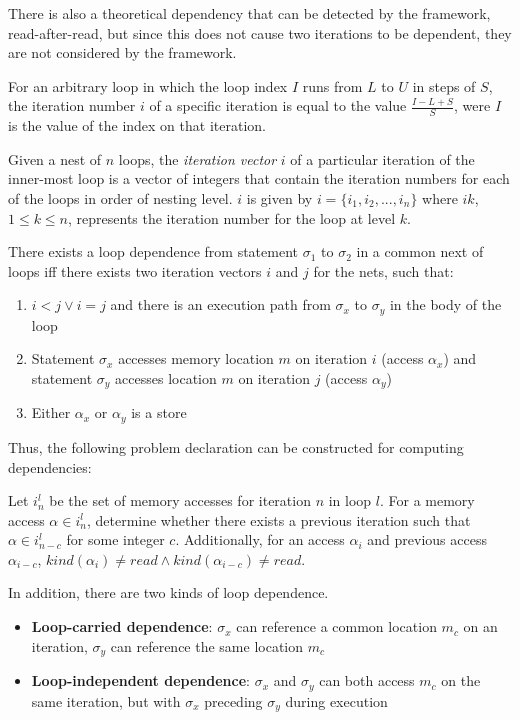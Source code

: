 	There is also a theoretical dependency that can be detected by the framework, read-after-read, but since this does not cause two iterations to be dependent, they are not considered by the framework.
	
	For an arbitrary loop in which the loop index $I$ runs from $L$ to $U$ in steps of $S$, the iteration number $i$ of a specific iteration is equal to the value $\frac{I-L+S}{S}$, were $I$ is the value of the index on that iteration.
	
	Given a nest of $n$ loops, the \textit{iteration vector} $i$ of a particular iteration of the inner-most loop is a vector of integers that contain the iteration numbers for each of the loops in order of nesting level. $i$ is given by $i=\{i_1, i_2, ..., i_n\}$ where $ik$, $1 \leq k \leq n$, represents the iteration number for the loop at level $k$.
	
	There exists a loop dependence from statement $\sigma_1$ to $\sigma_2$ in a common next of loops iff there exists two iteration vectors $i$ and $j$ for the nets, such that:
	
	\begin{enumerate}
		\item $i < j \lor i = j$ and there is an execution path from $\sigma_x$ to $\sigma_y$ in the body of the loop
		\item Statement $\sigma_x$ accesses memory location $m$ on iteration $i$ (access $\alpha_x$) and statement $\sigma_y$ accesses location $m$ on iteration $j$ (access $\alpha_y$)
		\item Either $\alpha_x$ or $\alpha_y$ is a store
	\end{enumerate}
	
	Thus, the following problem declaration can be constructed for computing dependencies:
	
	Let $i^l_n$ be the set of memory accesses for iteration $n$ in loop $l$. For a memory access $\alpha \in i^l_n$, determine whether there exists a previous iteration such that $\alpha \in i^l_{n-c}$ for some integer $c$. Additionally, for an access $\alpha_i$ and previous access $\alpha_{i-c}$, $kind(\alpha_i) \neq read \land kind(\alpha_{i-c}) \neq read$.
	
	In addition, there are two kinds of loop dependence.
	
	\begin{itemize}
		\item \textbf{Loop-carried dependence}: $\sigma_x$ can reference a common location $m_c$ on an iteration, $\sigma_y$ can reference the same location $m_c$
		\item \textbf{Loop-independent dependence}: $\sigma_x$ and $\sigma_y$ can both access $m_c$ on the same iteration, but with $\sigma_x$ preceding $\sigma_y$ during execution
	\end{itemize}

